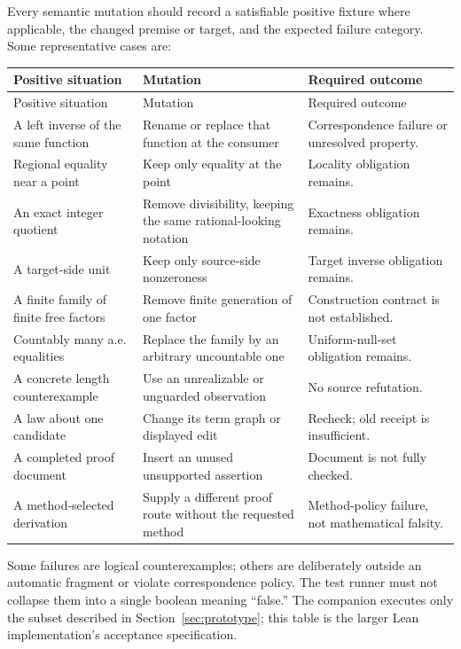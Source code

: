 \documentclass[11pt,a4paper]{article}
\theoremstyle{definition}
\theoremstyle{remark}
\begin{document}
Every semantic mutation should record a satisfiable positive fixture where
applicable, the changed premise or target, and the expected failure category.
Some representative cases are:
\begin{center}\small
\begin{longtable}{@{}P{.28\textwidth}P{.42\textwidth}P{.20\textwidth}@{}}
\toprule
Positive situation & Mutation & Required outcome\\\midrule\endfirsthead
\toprule Positive situation & Mutation & Required outcome\\\midrule\endhead
\bottomrule\endfoot
A left inverse of the same function & Rename or replace that function at the consumer & Correspondence failure or unresolved property.\\
Regional equality near a point & Keep only equality at the point & Locality obligation remains.\\
An exact integer quotient & Remove divisibility, keeping the same rational-looking notation & Exactness obligation remains.\\
A target-side unit & Keep only source-side nonzeroness & Target inverse obligation remains.\\
A finite family of finite free factors & Remove finite generation of one factor & Construction contract is not established.\\
Countably many a.e. equalities & Replace the family by an arbitrary uncountable one & Uniform-null-set obligation remains.\\
A concrete length counterexample & Use an unrealizable or unguarded observation & No source refutation.\\
A law about one candidate & Change its term graph or displayed edit & Recheck; old receipt is insufficient.\\
A completed proof document & Insert an unused unsupported assertion & Document is not fully checked.\\
A method-selected derivation & Supply a different proof route without the requested method & Method-policy failure, not mathematical falsity.\\
\end{longtable}
\end{center}

Some failures are logical counterexamples; others are deliberately outside an
automatic fragment or violate correspondence policy. The test runner must not
collapse them into a single boolean meaning ``false.'' The companion executes
only the subset described in Section~\ref{sec:prototype}; this table is the
larger Lean implementation's acceptance specification.
\end{document}
